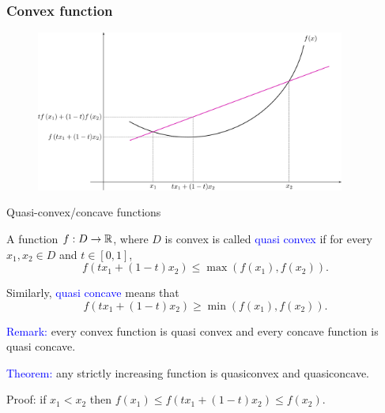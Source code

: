 \documentclass[11pt,aspectratio=169]{beamer}
\begin{document}
\begin{frame}
\frametitle{Convex function}

\begin{figure}
\includegraphics[width=4in]{img/convex} 
\end{figure}


\end{frame}

\begin{frame}{Quasi-convex/concave functions}

A function $f:D \rightarrow \mathbb R$, where $D$ is convex is called \textcolor{blue}{quasi convex} if for every  $x_1,x_2 \in D$ and $t \in [0,1]$, 
$$f(t x_1+(1-t)x_2)\leq \max(f(x_1), f(x_2)).$$


Similarly, \textcolor{blue}{quasi concave} means that
$$f(t x_1+(1-t)x_2)\geq \min(f(x_1), f(x_2)).$$

\vskip 12pt
\textcolor{blue}{Remark:} every convex function is quasi convex and every concave function is quasi concave.
\vskip 12pt

\textcolor{blue}{Theorem:} any strictly increasing function is quasiconvex and quasiconcave.

\begin{tiny} Proof: if $x_1<x_2$ then $f(x_1) \leq f(t x_1+(1-t)x_2)\leq f(x_2)$.\end{tiny}
\end{frame}
\end{document}
